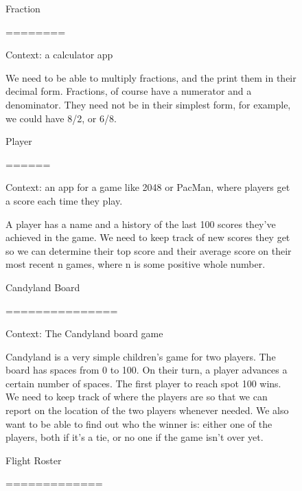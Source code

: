 \documentclass[12pt]{article}
\begin{document}
\begin{figure}
    \begin{mdframed}
        Fraction

        ========

        \bigskip

        Context: a calculator app

        \bigskip

        We need to be able to multiply fractions, and the print them in their decimal
        form. Fractions, of course have a numerator and a denominator. They need not be
        in their simplest form, for example, we could have 8/2, or 6/8.

        \bigskip

        Player

        ======

        \bigskip

        Context: an app for a game like 2048 or PacMan, where players get a score each
        time they play.

        \bigskip

        A player has a name and a history of the last 100 scores they've achieved in the
        game. We need to keep track of new scores they get so we can determine their top
        score and their average score on their most recent n games, where n is some
        positive whole number.

        \bigskip

        Candyland Board

        ===============

        \bigskip

        Context: The Candyland board game

        \bigskip

        Candyland is a very simple children's game for two players. The board has spaces
        from 0 to 100. On their turn, a player advances a certain number of spaces. The
        first player to reach spot 100 wins. We need to keep track of where the players
        are so that we can report on the location of the two players whenever needed.
        We also want to be able to find out who the winner is: either one of the
        players, both if it's a tie, or no one if the game isn't over yet.

        \bigskip

        Flight Roster

        =============


\end{mdframed}
\end{figure}
\end{document}
